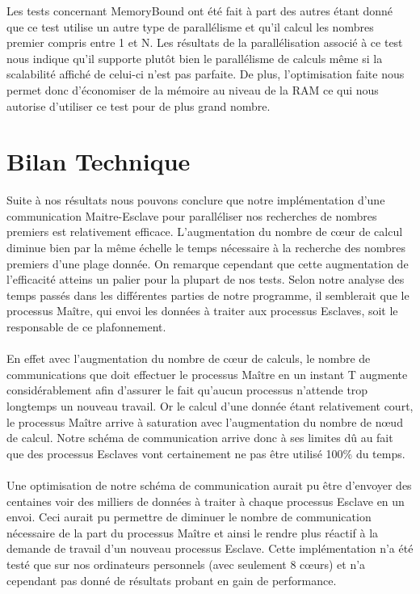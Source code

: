 	Les tests concernant MemoryBound ont été fait à part des autres étant donné que ce test utilise un autre type de parallélisme et qu'il calcul les nombres premier compris entre 1 et N. Les résultats de la parallélisation associé à ce test nous indique qu'il supporte plutôt bien le parallélisme de calculs même si la scalabilité affiché de celui-ci n'est pas parfaite. De plus, l'optimisation faite nous permet donc d'économiser de la mémoire au niveau de la RAM ce qui nous autorise d'utiliser ce test pour de plus grand nombre.
	\section{Bilan Technique}	
		
Suite à nos résultats nous pouvons conclure que notre implémentation d'une communication Maitre-Esclave pour paralléliser nos recherches de nombres premiers est relativement efficace.
L'augmentation du nombre de cœur de calcul diminue bien par la même échelle le temps nécessaire à la recherche des nombres premiers d'une plage donnée.
On remarque cependant que cette augmentation de l'efficacité atteins un palier pour la plupart de nos tests. Selon notre analyse des temps passés dans les différentes parties de notre programme, il semblerait que le processus Maître, qui envoi les données à traiter aux processus Esclaves, soit le responsable de ce plafonnement.
\paragraph{}En effet avec l'augmentation du nombre de cœur de calculs, le nombre de communications que doit effectuer le processus Maître en un instant T augmente considérablement afin d'assurer le fait qu'aucun processus n'attende trop longtemps un nouveau travail.
Or le calcul d'une donnée étant relativement court, le processus Maître arrive à saturation avec l'augmentation du nombre de nœud de calcul.
Notre schéma de communication arrive donc à ses limites dû au fait que des processus Esclaves vont certainement ne pas être utilisé 100\% du temps.

\paragraph{}Une optimisation de notre schéma de communication aurait pu être d'envoyer des centaines voir des milliers de données à traiter à chaque processus Esclave en un envoi.
Ceci aurait pu permettre de diminuer le nombre de communication nécessaire de la part du processus Maître et ainsi le rendre plus réactif à la demande de travail d'un nouveau processus Esclave.
Cette implémentation n'a été testé que sur nos ordinateurs personnels (avec seulement 8 cœurs) et n'a cependant pas donné de résultats probant en gain de performance.

